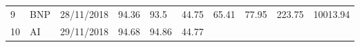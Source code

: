 \documentclass[
  11pt,
]{article}
\begin{document}
\begin{longtable}[]{@{}llllllllll@{}}
\begin{minipage}[t]{0.05\columnwidth}\raggedright
9\strut
\end{minipage} & \begin{minipage}[t]{0.07\columnwidth}\raggedright
BNP\strut
\end{minipage} & \begin{minipage}[t]{0.11\columnwidth}\raggedright
28/11/2018\strut
\end{minipage} & \begin{minipage}[t]{0.07\columnwidth}\raggedright
94.36\strut
\end{minipage} & \begin{minipage}[t]{0.07\columnwidth}\raggedright
93.5\strut
\end{minipage} & \begin{minipage}[t]{0.07\columnwidth}\raggedright
44.75\strut
\end{minipage} & \begin{minipage}[t]{0.07\columnwidth}\raggedright
65.41\strut
\end{minipage} & \begin{minipage}[t]{0.07\columnwidth}\raggedright
77.95\strut
\end{minipage} & \begin{minipage}[t]{0.08\columnwidth}\raggedright
223.75\strut
\end{minipage} & \begin{minipage}[t]{0.09\columnwidth}\raggedright
10013.94\strut
\end{minipage}\tabularnewline
\begin{minipage}[t]{0.05\columnwidth}\raggedright
10\strut
\end{minipage} & \begin{minipage}[t]{0.07\columnwidth}\raggedright
AI\strut
\end{minipage} & \begin{minipage}[t]{0.11\columnwidth}\raggedright
29/11/2018\strut
\end{minipage} & \begin{minipage}[t]{0.07\columnwidth}\raggedright
94.68\strut
\end{minipage} & \begin{minipage}[t]{0.07\columnwidth}\raggedright
94.86\strut
\end{minipage} & \begin{minipage}[t]{0.07\columnwidth}\raggedright
44.77\strut
\end{minipage} & \begin{minipage}[t]{0.07\columnwidth}\raggedright

\end{minipage}
\end{longtable}
\end{document}
